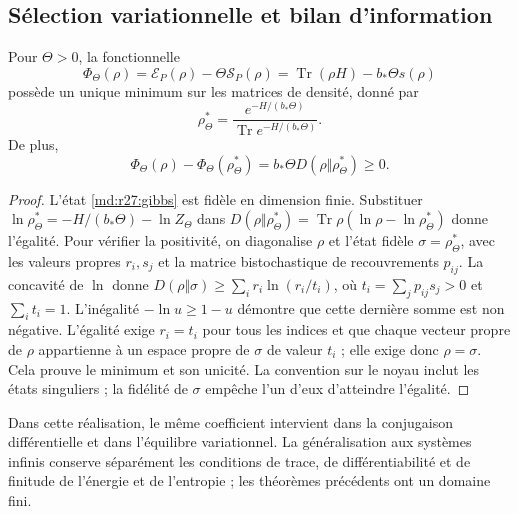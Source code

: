 \subsection{Sélection variationnelle et bilan d'information}
\begin{theorem}
Pour $\Theta>0$, la fonctionnelle
\begin{equation}
 \Phi_\Theta(\rho)=\mathcal E_P(\rho)-\Theta\mathcal S_P(\rho)
 =\operatorname{Tr}(\rho H)-b_*\Theta s(\rho)
 \label{md:r27:funcional}
\end{equation}
possède un unique minimum sur les matrices de densité, donné par
\begin{equation}
 \rho_\Theta^*=
 \frac{e^{-H/(b_*\Theta)}}{\operatorname{Tr}e^{-H/(b_*\Theta)}}.
 \label{md:r27:gibbs}
\end{equation}
De plus,
\begin{equation}
 \Phi_\Theta(\rho)-\Phi_\Theta(\rho_\Theta^*)
 =b_*\Theta D(\rho\Vert\rho_\Theta^*)\ge0.
 \label{md:r27:variacional}
\end{equation}
\end{theorem}
\begin{proof}
L'état \eqref{md:r27:gibbs} est fidèle en dimension finie. Substituer $\ln\rho_\Theta^*=-H/(b_*\Theta)-\ln Z_\Theta$ dans $D(\rho\Vert\rho_\Theta^*)=\operatorname{Tr}\rho(\ln\rho-\ln\rho_\Theta^*)$ donne l'égalité. Pour vérifier la positivité, on diagonalise $\rho$ et l'état fidèle $\sigma=\rho_\Theta^*$, avec les valeurs propres $r_i,s_j$ et la matrice bistochastique de recouvrements $p_{ij}$. La concavité de $\ln$ donne $D(\rho\Vert\sigma)\ge\sum_i r_i\ln(r_i/t_i)$, où $t_i=\sum_jp_{ij}s_j>0$ et $\sum_i t_i=1$. L'inégalité $-\ln u\ge1-u$ démontre que cette dernière somme est non négative. L'égalité exige $r_i=t_i$ pour tous les indices et que chaque vecteur propre de $\rho$ appartienne à un espace propre de $\sigma$ de valeur $t_i$ ; elle exige donc $\rho=\sigma$. Cela prouve le minimum et son unicité. La convention sur le noyau inclut les états singuliers ; la fidélité de $\sigma$ empêche l'un d'eux d'atteindre l'égalité.
\end{proof}
Dans cette réalisation, le même coefficient intervient dans la conjugaison différentielle et dans l'équilibre variationnel. La généralisation aux systèmes infinis conserve séparément les conditions de trace, de différentiabilité et de finitude de l'énergie et de l'entropie ; les théorèmes précédents ont un domaine fini.

